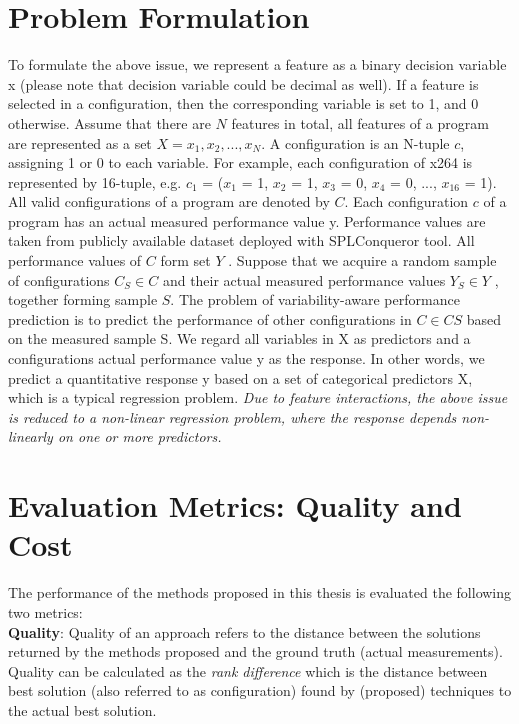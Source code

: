 \section{Problem Formulation}
To formulate the above issue, we represent a feature as a binary decision variable x (please note that decision variable could be decimal as well).
If a feature is selected in a configuration, then the corresponding variable is set to 1, and
0 otherwise. Assume that there are $N$ features in total, all features of a program are
represented as a set $X = {x_1, x_2, ..., x_N}$. A configuration is an N-tuple $c$, assigning 1 or 0
to each variable. For example, each configuration of x264 is represented by 16-tuple, e.g.
$c_1$ = ($x_1$ = 1, $x_2$ = 1, $x_3$ = 0, $x_4$ = 0, ..., $x_{16}$ = 1). All valid configurations of a program are
denoted by $C$.
Each configuration $c$ of a program has an actual measured performance value y. Performance values are taken from publicly available dataset deployed with SPLConqueror
tool.
All performance values of  $C$ form set $Y$ . Suppose that we acquire a
random sample of configurations $C_S \in C$ and their actual measured performance values
$Y_S \in Y$ , together forming sample $S$. The problem of variability-aware performance prediction
is to predict the performance of other configurations in $C \in CS$ based on the measured
sample S.
We regard all variables in X as predictors and a configuration\textquotesingle s actual performance
value y as the response. In other words, we predict a quantitative response y based on a
set of categorical predictors X, which is a typical regression problem. \textit{Due to feature
interactions, the above issue is reduced to a non-linear regression problem, where the
response depends non-linearly on one or more predictors.}




\section{Evaluation Metrics: Quality and Cost}
The performance of the methods proposed in this thesis is evaluated the following two metrics:\\
\noindent\textbf{Quality}: Quality of an approach refers to the distance between the solutions returned by the methods proposed and the ground truth (actual measurements). Quality can be calculated as the \textit{rank difference} which is the distance between best solution (also referred to as configuration) found by (proposed) techniques to the actual best solution.

